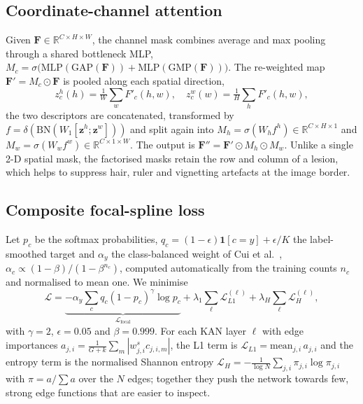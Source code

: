 \documentclass[conference]{IEEEtran}
\begin{document}
\subsection{Coordinate-channel attention}
Given $\mathbf{F}\in\mathbb{R}^{C\times H\times W}$, the channel mask combines average and max pooling through a shared bottleneck MLP, $M_c=\sigma\!\big(\mathrm{MLP}(\mathrm{GAP}(\mathbf{F}))+\mathrm{MLP}(\mathrm{GMP}(\mathbf{F}))\big)$. The re-weighted map $\mathbf{F}'=M_c\odot\mathbf{F}$ is pooled along each spatial direction,
\begin{equation}
z^h_c(h)=\tfrac{1}{W}\textstyle\sum_{w}F'_c(h,w),\quad z^w_c(w)=\tfrac{1}{H}\textstyle\sum_{h}F'_c(h,w),
\end{equation}
the two descriptors are concatenated, transformed by $f=\delta(\mathrm{BN}(W_1[\mathbf{z}^h;\mathbf{z}^w]))$ and split again into $M_h=\sigma(W_hf^h)\in\mathbb{R}^{C\times H\times 1}$ and $M_w=\sigma(W_wf^w)\in\mathbb{R}^{C\times 1\times W}$. The output is $\mathbf{F}''=\mathbf{F}'\odot M_h\odot M_w$. Unlike a single 2-D spatial mask, the factorised masks retain the row and column of a lesion, which helps to suppress hair, ruler and vignetting artefacts at the image border.

\subsection{Composite focal-spline loss}
Let $p_c$ be the softmax probabilities, $q_c=(1-\epsilon)\mathbf{1}[c{=}y]+\epsilon/K$ the label-smoothed target and $\alpha_y$ the class-balanced weight of Cui et al.~\cite{cui2019classbalanced}, $\alpha_c\propto(1-\beta)/(1-\beta^{n_c})$, computed automatically from the training counts $n_c$ and normalised to mean one. We minimise
\begin{equation}
\mathcal{L}=\underbrace{-\alpha_y\sum_{c}q_c(1-p_c)^{\gamma}\log p_c}_{\mathcal{L}_{\text{focal}}}+\lambda_1\sum_{\ell}\mathcal{L}^{(\ell)}_{L1}+\lambda_H\sum_{\ell}\mathcal{L}^{(\ell)}_{H},
\end{equation}
with $\gamma=2$, $\epsilon=0.05$ and $\beta=0.999$. For each KAN layer $\ell$ with edge importances $a_{j,i}=\frac{1}{G+k}\sum_m|w^s_{j,i}c_{j,i,m}|$, the L1 term is $\mathcal{L}_{L1}=\mathrm{mean}_{j,i}\,a_{j,i}$ and the entropy term is the normalised Shannon entropy $\mathcal{L}_{H}=-\frac{1}{\log N}\sum_{j,i}\pi_{j,i}\log\pi_{j,i}$ with $\pi=a/\sum a$ over the $N$ edges; together they push the network towards few, strong edge functions that are easier to inspect.
\end{document}

